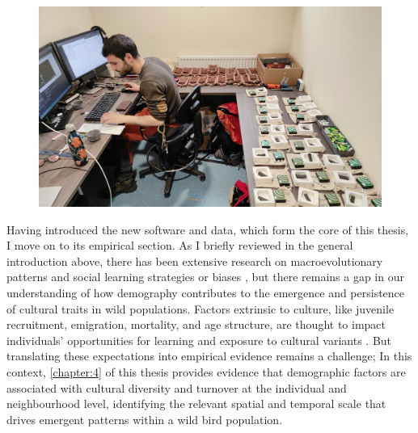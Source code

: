 \begin{figure}[bh!]
    \centering
    \includegraphics[width=\linewidth]{figures/chapter_1/nilo.jpg}
    \label{c1_fig:nilo}
\end{figure}

Having introduced the new software and data, which form the core of this thesis, I move on to its empirical section. As I briefly reviewed in the general introduction above, there has been extensive research on macroevolutionary patterns and social learning strategies or biases \parencite{pike2010, kendal2015, aplin2017, lachlan2018, tchernichovski2021}, but there remains a gap in our understanding of how demography contributes to the emergence and persistence of cultural traits in wild populations. Factors extrinsic to culture, like juvenile recruitment, emigration, mortality, and age structure, are thought to impact individuals' opportunities for learning and exposure to cultural variants \parencite{deffner2022a, deffner2022, kandler2023, fogarty2019, deffner2020, derex2016, kirby2021, nunn2009, barta2023}. But translating these expectations into empirical evidence remains a challenge; In this context, \autoref{chapter:4} of this thesis provides evidence that demographic factors are associated with cultural diversity and turnover at the individual and neighbourhood level, identifying the relevant spatial and temporal scale that drives emergent patterns within a wild bird population.

